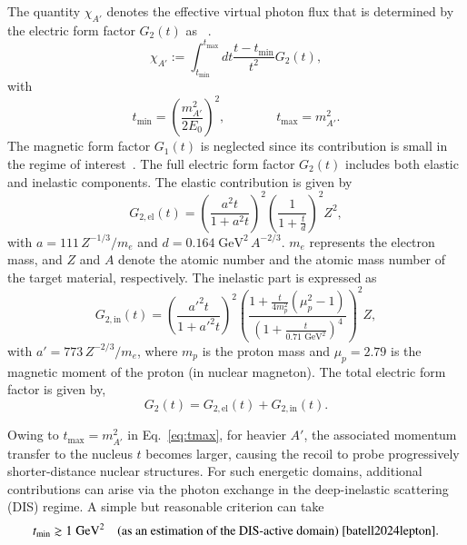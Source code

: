\documentclass[onecolumn, aps, nofootinbib, prd, preprint, floats, floatfix, amsmath, amssymb, superscriptaddress, preprintnumbers]{revtex4-1}
\begin{document}
The quantity $\chi_{A'}$ denotes the effective virtual photon flux that is determined by the electric form factor $G_2(t)$ as ~\cite{bjorken2009new,tsai1986axion,von1934radiation,williams1935correlation,kim1973improved}.
\begin{equation}
   \chi_{A'} := \int_{t_{\min}}^{t_{\max}} dt \frac{t - t_{\min}}{t^2} G_2(t), 
   \label{XA}
\end{equation}
with
\begin{equation}
    t_{\min} = \left( \frac{m_{A'}^2}{2E_0} \right)^2, \qquad \qquad t_{\max} = m_{A'}^2.
    \label{eq:tmax}
\end{equation}
The magnetic form factor $G_1(t)$ is neglected since its contribution is small in the regime of interest~\cite{bjorken2009new}. The full electric form factor $G_2(t)$ includes both elastic and inelastic components. The elastic contribution is given by
\begin{equation}
    G_{2,\text{el}}(t) = \left( \frac{a^2 t}{1 + a^2 t} \right)^2 \left( \frac{1}{1 + \frac{t}{d}} \right)^2 Z^2,
    \label{G2}
\end{equation}
with $a = 111\,Z^{-1/3}/m_e$ and $d = 0.164\;\text{GeV}^2\,A^{-2/3}$. $m_e$ represents the electron mass, and $Z$ and $A$ denote the atomic number and the atomic mass number of the target material, respectively. The inelastic part is expressed as
\begin{equation}
    G_{2,\text{in}}(t) = \left( \frac{a'^2 t}{1 + a'^2 t} \right)^2 \left( \frac{1 + \frac{t}{4m_p^2}(\mu_p^2 - 1)}{\left(1 + \frac{t}{0.71 \text{ GeV}^2}\right)^4} \right)^2 Z,
\end{equation}
with $a' = 773\,Z^{-2/3}/m_e$, where $m_p$ is the proton mass and $\mu_p = 2.79$ is the magnetic moment of the proton (in nuclear magneton). The total electric form factor is given by,
\begin{equation}
    G_2(t) = G_{2,\text{el}}(t) + G_{2,\text{in}}(t).
\end{equation}

Owing to $t_{\max} = m_{A'}^2$ in Eq.~\eqref{eq:tmax}, for heavier $A'$, the associated momentum transfer to the nucleus $t$ becomes larger, causing the recoil to probe progressively shorter-distance nuclear structures. For such energetic domains, additional contributions can arise via the photon exchange in the deep-inelastic scattering (DIS) regime. A simple but reasonable criterion can take
\begin{equation}
    t_{\min} \gtrsim 1\;\mathrm{GeV}^2 \quad
    \text{(as an estimation of the DIS-active domain)} ~\cite{batell2024lepton}.
\end{equation}
\end{document}
